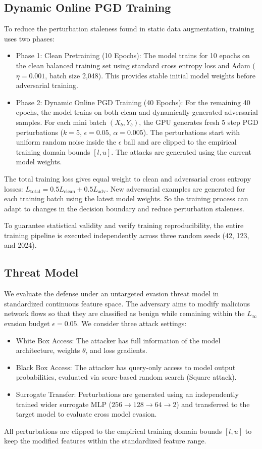 \documentclass[conference]{IEEEtran}
\begin{document}
\subsection{Dynamic Online PGD Training}
To reduce the perturbation staleness found in static data augmentation, training uses two phases:
\begin{itemize}
    \item Phase 1: Clean Pretraining (10 Epochs): The model trains for 10 epochs on the clean balanced training set using standard cross entropy loss and Adam ($\eta=0.001$, batch size 2,048). This provides stable initial model weights before adversarial training.
    \item Phase 2: Dynamic Online PGD Training (40 Epochs): For the remaining 40 epochs, the model trains on both clean and dynamically generated adversarial samples. For each mini batch $(X_b,Y_b)$, the GPU generates fresh 5 step PGD perturbations ($k=5$, $\epsilon=0.05$, $\alpha=0.005$). The perturbations start with uniform random noise inside the $\epsilon$ ball and are clipped to the empirical training domain bounds $[l,u]$. The attacks are generated using the current model weights.
\end{itemize}
The total training loss gives equal weight to clean and adversarial cross entropy losses: $L_{\text{total}}=0.5L_{\text{clean}}+0.5L_{\text{adv}}$. New adversarial examples are generated for each training batch using the latest model weights. So the training process can adapt to changes in the decision boundary and reduce perturbation staleness.

To guarantee statistical validity and verify training reproducibility, the entire training pipeline is executed independently across three random seeds (42, 123, and 2024).

\subsection{Threat Model}
We evaluate the defense under an untargeted evasion threat model in standardized continuous feature space. The adversary aims to modify malicious network flows so that they are classified as benign while remaining within the $L_\infty$ evasion budget $\epsilon=0.05$. We consider three attack settings:
\begin{itemize}
    \item White Box Access: The attacker has full information of the model architecture, weights $\theta$, and loss gradients.
    \item Black Box Access: The attacker has query-only access to model output probabilities, evaluated via score-based random search (Square attack).
    \item Surrogate Transfer: Perturbations are generated using an independently trained wider surrogate MLP ($256\to128\to64\to2$) and transferred to the target model to evaluate cross model evasion.
\end{itemize}
All perturbations are clipped to the empirical training domain bounds $[l,u]$ to keep the modified features within the standardized feature range.
\end{document}
